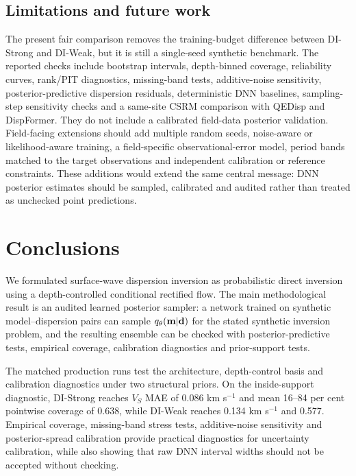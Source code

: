 \documentclass[referee]{gji}
\begin{document}
\subsection{Limitations and future work}

The present fair comparison removes the training-budget difference between DI-Strong and DI-Weak, but it is still a single-seed synthetic benchmark. The reported checks include bootstrap intervals, depth-binned coverage, reliability curves, rank/PIT diagnostics, missing-band tests, additive-noise sensitivity, posterior-predictive dispersion residuals, deterministic DNN baselines, sampling-step sensitivity checks and a same-site CSRM comparison with QEDisp and DispFormer. They do not include a calibrated field-data posterior validation. Field-facing extensions should add multiple random seeds, noise-aware or likelihood-aware training, a field-specific observational-error model, period bands matched to the target observations and independent calibration or reference constraints. These additions would extend the same central message: DNN posterior estimates should be sampled, calibrated and audited rather than treated as unchecked point predictions.

\section{Conclusions}

We formulated surface-wave dispersion inversion as probabilistic direct inversion using a depth-controlled conditional rectified flow. The main methodological result is an audited learned posterior sampler: a network trained on synthetic model--dispersion pairs can sample $q_\theta({\bf m}|{\bf d})$ for the stated synthetic inversion problem, and the resulting ensemble can be checked with posterior-predictive tests, empirical coverage, calibration diagnostics and prior-support tests.

The matched production runs test the architecture, depth-control basis and calibration diagnostics under two structural priors. On the inside-support diagnostic, DI-Strong reaches $V_S$ MAE of 0.086 km s$^{-1}$ and mean 16--84 per cent pointwise coverage of 0.638, while DI-Weak reaches 0.134 km s$^{-1}$ and 0.577. Empirical coverage, missing-band stress tests, additive-noise sensitivity and posterior-spread calibration provide practical diagnostics for uncertainty calibration, while also showing that raw DNN interval widths should not be accepted without checking.
\end{document}
